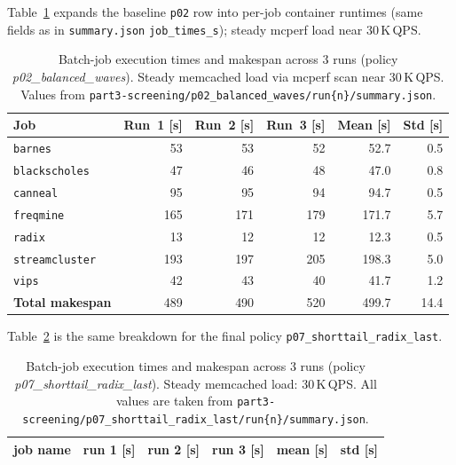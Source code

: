 \begin{enumerate}
\begin{enumerate}
Table~\ref{tab:p3_runtimes} expands the baseline \texttt{p02} row into
per-job container runtimes (same fields as in \texttt{summary.json}
\texttt{job\_times\_s}); steady mcperf load near 30\,K\,QPS.

\begin{table}[htbp]
\centering
\small
\caption{Batch-job execution times and makespan across 3 runs (policy
  \emph{p02\_balanced\_waves}).  Steady memcached load via mcperf scan near
  30\,K\,QPS.
  Values from \texttt{part3-screening/p02\_balanced\_waves/run\{n\}/summary.json}.}
\label{tab:p3_runtimes}
\begin{tabular}{lrrrrr}
\toprule
\textbf{Job} & \textbf{Run~1 [s]} & \textbf{Run~2 [s]} & \textbf{Run~3 [s]}
             & \textbf{Mean [s]} & \textbf{Std [s]} \\
\midrule
\texttt{barnes}        & 53 & 53 & 52 & 52.7 & 0.5 \\
\texttt{blackscholes}  & 47 & 46 & 48 & 47.0 & 0.8 \\
\texttt{canneal}       & 95 & 95 & 94 & 94.7 & 0.5 \\
\texttt{freqmine}      & 165 & 171 & 179 & 171.7 & 5.7 \\
\texttt{radix}         & 13 & 12 & 12 & 12.3 & 0.5 \\
\texttt{streamcluster} & 193 & 197 & 205 & 198.3 & 5.0 \\
\texttt{vips}          & 42 & 43 & 40 & 41.7 & 1.2 \\
\midrule
\textbf{Total makespan} & 489 & 490 & 520 & 499.7 & 14.4 \\
\bottomrule
\end{tabular}
\end{table}

Table~\ref{tab:p7_runtimes} is the same breakdown for the final policy
\texttt{p07\_shorttail\_radix\_last}.

\begin{table}[htbp]
    \centering
    \small
    \caption{Batch-job execution times and makespan across 3 runs
    (policy \emph{p07\_shorttail\_radix\_last}). Steady memcached load:
    30\,K\,QPS. All values are taken from \texttt{part3-screening/p07\_shorttail\_radix\_last/run\{n\}/summary.json}.}
    \label{tab:p7_runtimes}

    \begin{tabular}{ |c|c|c|c|c|c| }
        \hline
        job name & run 1 [s] & run 2 [s] & run 3 [s]
        & mean [s] & std [s] \\ \hline \hline


\end{tabular}
\end{table}
\end{enumerate}
\end{enumerate}
